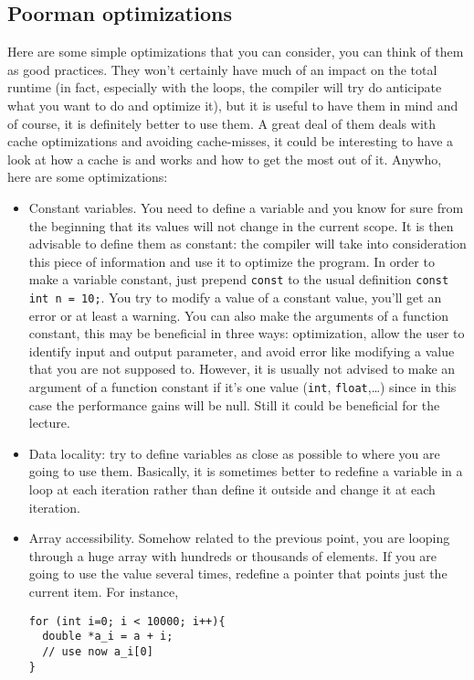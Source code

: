 \documentclass[a4paper,12pt,%
              final%
              ]{article}
\begin{document}
\subsection{Poorman optimizations}
  Here are some simple optimizations that you can consider, you can think of them as good practices. They won't certainly have much of an impact on the total runtime (in fact, especially with the loops, the compiler will try do anticipate what you want to do and optimize it), but it is useful to have them in mind and of course, it is definitely better to use them. A great deal of them deals with cache optimizations and avoiding cache-misses, it could be interesting to have a look at how a cache is and works and how to get the most out of it. Anywho, here are some optimizations:
    \begin{itemize}
      \item Constant variables. You need to define a variable and you know for sure from the beginning that its values will not change in the current scope. It is then advisable to define them as constant: the compiler will take into consideration this piece of information and use it to optimize the program. In order to make a variable constant, just prepend \texttt{const} to the usual definition \texttt{const int n = 10;}. You try to modify a value of a constant value, you'll get an error or at least a warning. You can also make the arguments of a function constant, this may be beneficial in three ways: optimization, allow the user to identify input and output parameter, and avoid error like modifying a value that you are not supposed to. However, it is usually not advised to make an argument of a function constant if it's one value (\texttt{int}, \texttt{float},\ldots) since in this case the performance gains will be null. Still it could be beneficial for the lecture.
      \item Data locality: try to define variables as close as possible to where you are going to use them. Basically, it is sometimes better to redefine a variable in a loop at each iteration rather than define it outside and change it at each iteration.
      \item Array accessibility. Somehow related to the previous point, you are looping through a huge array with hundreds or thousands of elements. If you are going to use the value several times, redefine a pointer that points just the current item. For instance,
\begin{verbatim}
for (int i=0; i < 10000; i++){
  double *a_i = a + i;
  // use now a_i[0]
}

\end{verbatim}
\end{itemize}
\end{document}
